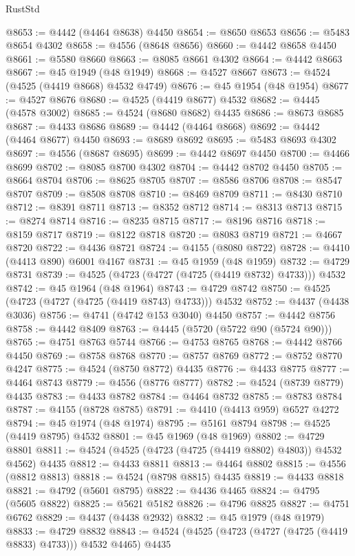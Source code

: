 \begin{lexlean}{RustStd}
\begin{coremodule}
@8653 := @4442 (@4464 @8638) @4450
@8654 := @8650 @8653
@8656 := @5483 @8654 @4302
@8658 := @4556 (@8648 @8656)
@8660 := @4442 @8658 @4450
@8661 := @5580 @8660
@8663 := @8085 @8661 @4302
@8664 := @4442 @8663
@8667 := @45 @1949 (@48 @1949)
@8668 := @4527 @8667
@8673 := @4524 (@4525 (@4419 @8668) @4532 @4749)
@8676 := @45 @1954 (@48 @1954)
@8677 := @4527 @8676
@8680 := @4525 (@4419 @8677) @4532
@8682 := @4445 (@4578 @3002)
@8685 := @4524 (@8680 @8682) @4435
@8686 := @8673 @8685
@8687 := @4433 @8686
@8689 := @4442 (@4464 @8668)
@8692 := @4442 (@4464 @8677) @4450
@8693 := @8689 @8692
@8695 := @5483 @8693 @4302
@8697 := @4556 (@8687 @8695)
@8699 := @4442 @8697 @4450
@8700 := @4466 @8699
@8702 := @8085 @8700 @4302
@8704 := @4442 @8702 @4450
@8705 := @8664 @8704
@8706 := @8625 @8705
@8707 := @8586 @8706
@8708 := @8547 @8707
@8709 := @8508 @8708
@8710 := @8469 @8709
@8711 := @8430 @8710
@8712 := @8391 @8711
@8713 := @8352 @8712
@8714 := @8313 @8713
@8715 := @8274 @8714
@8716 := @8235 @8715
@8717 := @8196 @8716
@8718 := @8159 @8717
@8719 := @8122 @8718
@8720 := @8083 @8719
@8721 := @4667 @8720
@8722 := @4436 @8721
@8724 := @4155 (@8080 @8722)
@8728 := @4410 (@4413 @890) @6001 @4167
@8731 := @45 @1959 (@48 @1959)
@8732 := @4729 @8731
@8739 := @4525 (@4723 (@4727 (@4725 (@4419 @8732) @4733))) @4532
@8742 := @45 @1964 (@48 @1964)
@8743 := @4729 @8742
@8750 := @4525 (@4723 (@4727 (@4725 (@4419 @8743) @4733))) @4532
@8752 := @4437 (@4438 @3036)
@8756 := @4741 (@4742 @153 @3040) @4450
@8757 := @4442 @8756
@8758 := @4442 @8409
@8763 := @4445 (@5720 (@5722 @90 (@5724 @90)))
@8765 := @4751 @8763 @5744
@8766 := @4753 @8765
@8768 := @4442 @8766 @4450
@8769 := @8758 @8768
@8770 := @8757 @8769
@8772 := @8752 @8770 @4247
@8775 := @4524 (@8750 @8772) @4435
@8776 := @4433 @8775
@8777 := @4464 @8743
@8779 := @4556 (@8776 @8777)
@8782 := @4524 (@8739 @8779) @4435
@8783 := @4433 @8782
@8784 := @4464 @8732
@8785 := @8783 @8784
@8787 := @4155 (@8728 @8785)
@8791 := @4410 (@4413 @959) @6527 @4272
@8794 := @45 @1974 (@48 @1974)
@8795 := @5161 @8794
@8798 := @4525 (@4419 @8795) @4532
@8801 := @45 @1969 (@48 @1969)
@8802 := @4729 @8801
@8811 := @4524 (@4525 (@4723 (@4725 (@4419 @8802) @4803)) @4532 @4562) @4435
@8812 := @4433 @8811
@8813 := @4464 @8802
@8815 := @4556 (@8812 @8813)
@8818 := @4524 (@8798 @8815) @4435
@8819 := @4433 @8818
@8821 := @4792 (@5601 @8795)
@8822 := @4436 @4465
@8824 := @4795 (@5605 @8822)
@8825 := @5621 @5182
@8826 := @4796 @8825
@8827 := @4751 @6762
@8829 := @4437 (@4438 @2932)
@8832 := @45 @1979 (@48 @1979)
@8833 := @4729 @8832
@8843 := @4524 (@4525 (@4723 (@4727 (@4725 (@4419 @8833) @4733))) @4532 @4465) @4435

\end{coremodule}
\end{lexlean}
